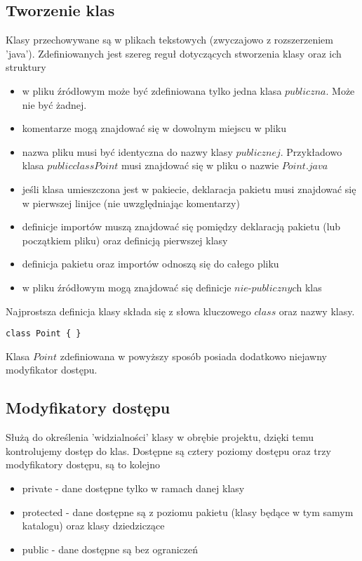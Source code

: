 \documentclass[11pt]{article}
\begin{document}
\subsection{Tworzenie klas}
Klasy przechowywane są w plikach tekstowych (zwyczajowo z rozszerzeniem 'java'). Zdefiniowanych jest szereg reguł dotyczących stworzenia klasy oraz ich struktury
\begin{itemize}
\item w pliku źródłowym może być zdefiniowana tylko jedna klasa $\textit{publiczna}$. Może nie być żadnej.
\item komentarze mogą znajdować się w dowolnym miejscu w pliku
\item nazwa pliku musi być identyczna do nazwy klasy $\textit{publicznej}$. Przykładowo klasa $public class Point { }$ musi znajdować się w pliku o nazwie $Point.java$
\item jeśli klasa umieszczona jest w pakiecie, deklaracja pakietu musi znajdować się w pierwszej linijce (nie uwzględniając komentarzy)
\item definicje importów muszą znajdować się pomiędzy deklaracją pakietu (lub początkiem pliku) oraz definicją pierwszej klasy
\item definicja pakietu oraz importów odnoszą się do całego pliku
\item w pliku źródłowym mogą znajdować się definicje $\textit{nie-publicznych}$ klas
\end{itemize}

Najprostsza definicja klasy składa się z słowa kluczowego $\textit{class}$ oraz nazwy klasy.
\begin{lstlisting}
class Point { }
\end{lstlisting}
Klasa $\textit{Point}$ zdefiniowana w powyższy sposób posiada dodatkowo niejawny modyfikator dostępu. 

 	
\subsection{Modyfikatory dostępu}
Służą do określenia 'widzialności' klasy w obrębie projektu, dzięki temu kontrolujemy dostęp do klas.
Dostępne są cztery poziomy dostępu oraz trzy modyfikatory dostępu, są to kolejno
\begin{itemize}
\item private - dane dostępne tylko w ramach danej klasy
\item protected - dane dostępne są z poziomu pakietu (klasy będące w tym samym katalogu) oraz klasy dziedziczące
\item public - dane dostępne są bez ograniczeń 
\end{itemize}
\end{document}
